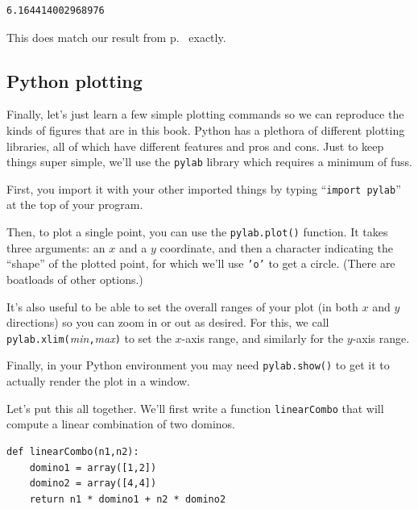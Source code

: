 \begin{Verbatim}[fontsize=\small,samepage=true,frame=leftline,framesep=5mm,framerule=1mm]
6.164414002968976
\end{Verbatim}

This does match our result from p.~\pageref{pythonNorm} exactly.

\pagebreak

\subsection*{Python plotting}


Finally, let's just learn a few simple plotting commands so we can reproduce
the kinds of figures that are in this book. Python has a plethora of different
plotting libraries, all of which have different features and pros and cons.
Just to keep things super simple, we'll use the \texttt{pylab} library which
requires a minimum of fuss.

First, you import it with your other imported things by typing ``\texttt{import
pylab}'' at the top of your program.

Then, to plot a single point, you can use the \texttt{pylab.plot()} function.
It takes three arguments: an $x$ and a $y$ coordinate, and then a character
indicating the ``shape'' of the plotted point, for which we'll use \texttt{'o'}
to get a circle. (There are boatloads of other options.)


It's also useful to be able to set the overall ranges of your plot (in both $x$
and $y$ directions) so you can zoom in or out as desired. For this, we call
\texttt{pylab.xlim(}\textsl{min}\texttt{,}\textsl{max}\texttt{)} to set the
$x$-axis range, and similarly for the $y$-axis range.

Finally, in your Python environment you may need \texttt{pylab.show()} to get
it to actually render the plot in a window.

\bigskip


Let's put this all together. We'll first write a function \texttt{linearCombo}
that will compute a linear combination of two dominos.

\begin{Verbatim}[fontsize=\small,samepage=true,frame=single,framesep=3mm]
def linearCombo(n1,n2):
    domino1 = array([1,2])
    domino2 = array([4,4])
    return n1 * domino1 + n2 * domino2
\end{Verbatim}

